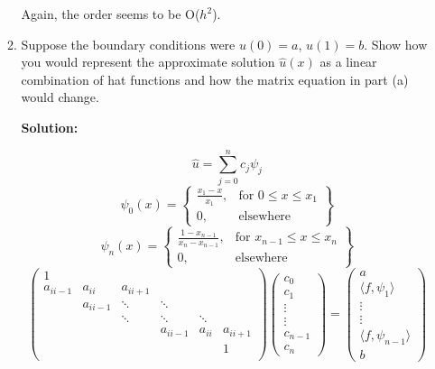 \documentclass[letterpaper,12pt]{article}
\begin{document}
\begin{enumerate}
\begin{enumerate}
Again, the order seems to be O($h^2$).
\item
Suppose the boundary conditions were $u(0) = a$, $u(1) = b$.  Show how you would
represent the approximate solution $\hat{u} (x)$ as a linear combination of hat
functions and how the matrix equation in part (a) would change.

 {\bf Solution:}

 
  \[\hat{u} = \sum_{j=0}^{n} c_j \psi_j\]
   \[
    \psi_0(x) = \left\{\begin{array}{lr}
        \frac{x_1-x}{x_1}, & \text{for } 0\leq x\leq x_1\\

        0, & \text{elsewhere } 
        \end{array}\right\} \]
    \[
    \psi_n(x) = \left\{\begin{array}{lr}
        \frac{1-x_{n-1}}{x_n-x_{n-1}}, & \text{for } x_{n-1}\leq x\leq x_n\\

        0, & \text{elsewhere } 
        \end{array}\right\} \]  
\[
 \left( \begin{array}{cccccc}
 1   &  &   &    &              \\
a_{ii-1}    & a_{ii} & a_{ii+1}  &    &              \\
    &  a_{ii-1}  & \ddots & \ddots   &    \\
     &    & \ddots & \ddots  &\ddots   \\
         &       &        &  a_{ii-1}     & a_{ii}  & a_{ii+1}\\
             &  &   &    &       & 1       \\\end{array} \right)
\left( \begin{array}{c} c_0\\ c_1 \\ \vdots \\ \vdots \\ c_{n-1} \\ c_n \end{array} 
\right) =
\left( \begin{array}{c}  a \\ \langle f,\psi_1 \rangle \\ \vdots \\  \vdots \\
\langle f, \psi_{n-1} \rangle \\ b \end{array} \right) 
\]
\end{enumerate}


\end{enumerate}
\end{document}
